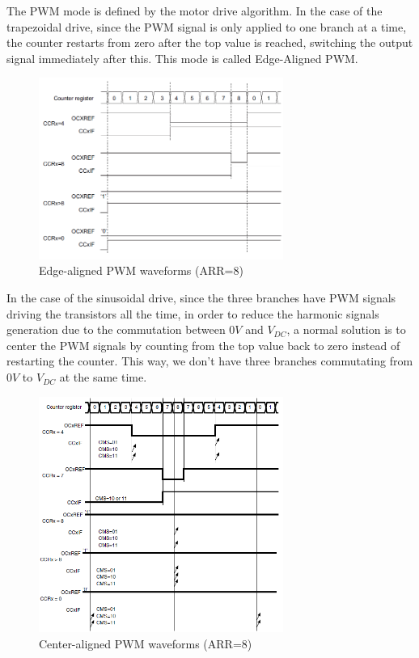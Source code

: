 The \ac{PWM} mode is defined by the motor drive algorithm. In the case of the trapezoidal drive, since the \ac{PWM} signal is only applied to one branch at a time, the counter restarts from zero after the top value is reached, switching the output signal immediately after this. This mode is called Edge-Aligned \ac{PWM}.

\begin{figure}[htbp]
\centering
\includegraphics[width=8cm]{Images/edge_pwm.png} 
\caption[Edge-aligned PWM waveforms]{Edge-aligned PWM waveforms (ARR=8)}
\label{fig:edge_pwm}
\end{figure}

In the case of the sinusoidal drive, since the three branches have \ac{PWM} signals driving the transistors all the time, in order to reduce the harmonic signals generation due to the commutation between $0V$ and $V_{DC}$, a normal solution is to center the \ac{PWM} signals by counting from the top value back to zero instead of restarting the counter. This way, we don't have three branches commutating from $0V$ to $V_{DC}$ at the same time.

\begin{figure}[htbp]
\centering
\includegraphics[width=8cm]{Images/center_pwm.png} 
\caption[Center-aligned PWM waveforms]{Center-aligned PWM waveforms (ARR=8)}
\label{fig:center_pwm}
\end{figure}


